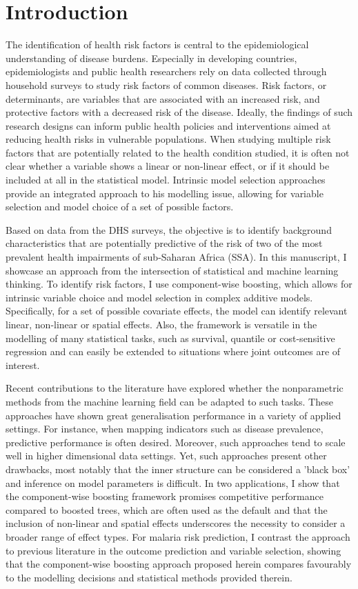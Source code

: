 \section{Introduction}\label{sec:introduction}

The identification of health risk factors is central to the epidemiological understanding of disease burdens. Especially in developing countries, epidemiologists and public health researchers rely on data collected through household surveys to study risk factors of common diseases. Risk factors, or determinants, are variables that are associated with an increased risk, and protective factors with a decreased risk of the disease. Ideally, the findings of such research designs can inform public health policies and interventions aimed at reducing health risks in vulnerable populations. When studying multiple risk factors that are potentially related to the health condition studied, it is often not clear whether a variable shows a linear or non-linear effect, or if it should be included at all in the statistical model. Intrinsic model selection approaches provide an integrated approach to his modelling issue, allowing for variable selection and model choice of a set of possible factors. 

Based on data from the DHS surveys, the objective is to identify background characteristics that are potentially predictive of the risk of two of the most prevalent health impairments of sub-Saharan Africa (SSA). In this manuscript, I showcase an approach from the intersection of statistical and machine learning thinking. To identify risk factors, I use component-wise boosting, which allows for intrinsic variable choice and model selection in complex additive models. Specifically, for a set of possible covariate effects, the model can identify relevant linear, non-linear or spatial effects. Also, the framework is versatile in the modelling of many statistical tasks, such as survival, quantile or cost-sensitive regression and can easily be extended to situations where joint outcomes are of interest. 

Recent contributions to the literature have explored whether the nonparametric methods from the machine learning field can be adapted to such tasks. These approaches have shown great generalisation performance in a variety of applied settings. For instance, when mapping indicators such as disease prevalence, predictive performance is often desired. Moreover, such approaches tend to scale well in higher dimensional data settings. Yet, such approaches present other drawbacks, most notably that the inner structure can be considered a 'black box' and inference on model parameters is difficult. In two applications, I show that the component-wise boosting framework promises competitive performance compared to boosted trees, which are often used as the default and that the inclusion of non-linear and spatial effects underscores the necessity to consider a broader range of effect types. For malaria risk prediction, I contrast the approach to previous literature in the outcome prediction and variable selection, showing that the component-wise boosting approach proposed herein compares favourably to the modelling decisions and statistical methods provided therein. 

